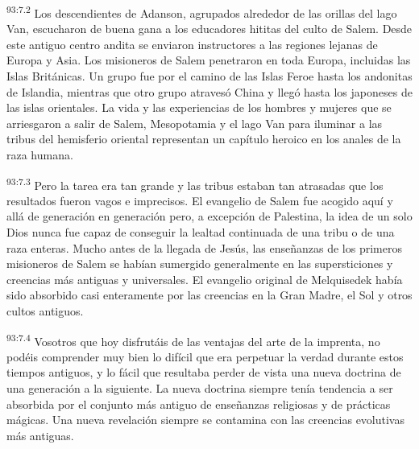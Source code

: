 \par
\textsuperscript{93:7.2} Los descendientes de Adanson, agrupados alrededor de las orillas del lago Van, escucharon de buena gana a los educadores hititas del culto de Salem. Desde este antiguo centro andita se enviaron instructores a las regiones lejanas de Europa y Asia. Los misioneros de Salem penetraron en toda Europa, incluidas las Islas Británicas. Un grupo fue por el camino de las Islas Feroe hasta los andonitas de Islandia, mientras que otro grupo atravesó China y llegó hasta los japoneses de las islas orientales. La vida y las experiencias de los hombres y mujeres que se arriesgaron a salir de Salem, Mesopotamia y el lago Van para iluminar a las tribus del hemisferio oriental representan un capítulo heroico en los anales de la raza humana.

\par
\textsuperscript{93:7.3} Pero la tarea era tan grande y las tribus estaban tan atrasadas que los resultados fueron vagos e imprecisos. El evangelio de Salem fue acogido aquí y allá de generación en generación pero, a excepción de Palestina, la idea de un solo Dios nunca fue capaz de conseguir la lealtad continuada de una tribu o de una raza enteras. Mucho antes de la llegada de Jesús, las enseñanzas de los primeros misioneros de Salem se habían sumergido generalmente en las supersticiones y creencias más antiguas y universales. El evangelio original de Melquisedek había sido absorbido casi enteramente por las creencias en la Gran Madre, el Sol y otros cultos antiguos.

\par
\textsuperscript{93:7.4} Vosotros que hoy disfrutáis de las ventajas del arte de la imprenta, no podéis comprender muy bien lo difícil que era perpetuar la verdad durante estos tiempos antiguos, y lo fácil que resultaba perder de vista una nueva doctrina de una generación a la siguiente. La nueva doctrina siempre tenía tendencia a ser absorbida por el conjunto más antiguo de enseñanzas religiosas y de prácticas mágicas. Una nueva revelación siempre se contamina con las creencias evolutivas más antiguas.

